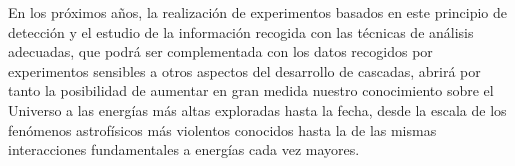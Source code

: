 \documentclass[11 pt, a4paper]{article} %
\numberwithin{equation}{section}
\numberwithin{figure}{section}
\numberwithin{table}{section}
\begin{document}
	En los próximos años, la realización de experimentos basados en este principio de detección y el estudio de la información recogida con las técnicas de análisis adecuadas, que podrá ser complementada con los datos recogidos por experimentos sensibles a otros aspectos del desarrollo de cascadas, abrirá por tanto la posibilidad de aumentar en gran medida nuestro conocimiento sobre el Universo a las energías más altas exploradas hasta la fecha, desde la escala de los fenómenos astrofísicos más violentos conocidos hasta la de las mismas interacciones fundamentales a energías cada vez mayores.
	\clearpage
	\fancyhead{}
	\appendix
	\nocite{*}
	
	

	
\end{document}
